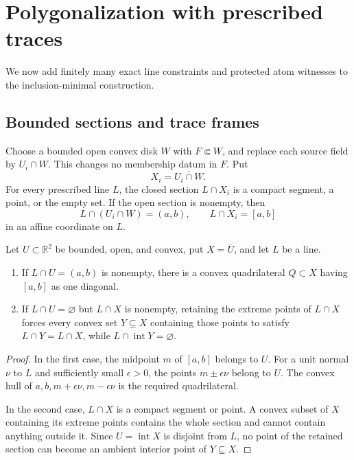 \section{Polygonalization with prescribed traces}\label{sec:traces}

We now add finitely many exact line constraints and protected atom
witnesses to the inclusion-minimal construction.

\subsection{Bounded sections and trace frames}

Choose a bounded open convex disk $W$ with $F\Subset W$, and replace each
source field by $U_i\cap W$.  This changes no membership datum in $F$.  Put
\[
 X_i=\overline{U_i\cap W}.
\]
For every prescribed line $L$, the closed section $L\cap X_i$ is a compact
segment, a point, or the empty set.  If the open section is nonempty, then
\[
 L\cap(U_i\cap W)=(a,b),\qquad L\cap X_i=[a,b]
\]
in an affine coordinate on $L$.

\begin{lemma}\label{lem:frame}
Let $U\subset\mathbb R^2$ be bounded, open, and convex, put
$X=\overline U$, and let $L$ be a line.
\begin{enumerate}
\item If $L\cap U=(a,b)$ is nonempty, there is a convex quadrilateral
      $Q\subset X$ having $[a,b]$ as one diagonal.
\item If $L\cap U=\varnothing$ but $L\cap X$ is nonempty, retaining the
      extreme points of $L\cap X$ forces every convex set
      $Y\subseteq X$ containing those points to satisfy
      $L\cap Y=L\cap X$, while $L\cap\operatorname{int}Y=\varnothing$.
\end{enumerate}
\end{lemma}

\begin{proof}
In the first case, the midpoint $m$ of $[a,b]$ belongs to $U$.  For a unit
normal $\nu$ to $L$ and sufficiently small $\epsilon>0$, the points
$m\pm\epsilon\nu$ belong to $U$.  The convex hull of
$a,b,m+\epsilon\nu,m-\epsilon\nu$ is the required quadrilateral.

In the second case, $L\cap X$ is a compact segment or point.  A convex
subset of $X$ containing its extreme points contains the whole section and
cannot contain anything outside it.  Since $U=\operatorname{int}X$ is
disjoint from $L$, no point of the retained section can become an ambient
interior point of $Y\subseteq X$.
\end{proof}

